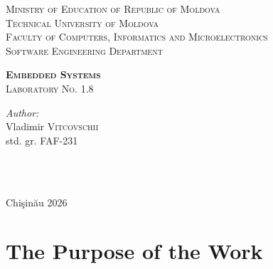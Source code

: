 \documentclass[12pt]{article}
\begin{document}
\begin{titlepage}
   \begin{center}
    \textsc{\large Ministry of Education of Republic of Moldova}\\[0.5cm]
    \textsc{\large Technical University of Moldova}\\[0.5cm]
    \textsc{\large Faculty of Computers, Informatics and Microelectronics}\\[0.5cm]
    \textsc{\large Software Engineering Department}\\[1.2cm]

    \vspace{25mm}

    {\LARGE \textbf{\textsc{Embedded Systems}}}\\[0.5cm]
    \textsc{\large Laboratory No. 1.8}\\[0.5cm]

    \newcommand{\HRule}{\rule{\linewidth}{0.5mm}}
    \vspace{80mm}

    \begin{minipage}[t]{0.4\textwidth}
    \begin{flushleft} \large
    \emph{Author:} \\
    Vladimir \textsc{Vitcovschii}\\
    std. gr. FAF-231
    \end{flushleft}
    \end{minipage}
    ~
    \begin{minipage}[t]{0.4\textwidth}
    \begin{flushright} \large
    \end{flushright}
    \end{minipage}\\[3cm]

    \vspace{5mm}
    \large Chi\c{s}in\u{a}u 2026\\[0.5cm]

    \vfill
    \end{center}
\end{titlepage}

\clearpage
\tableofcontents
\clearpage

\setcounter{page}{2}
\pagestyle{fancy}
\fancyhf{}
\rhead{\thepage}

\section{The Purpose of the Work}
\end{document}
